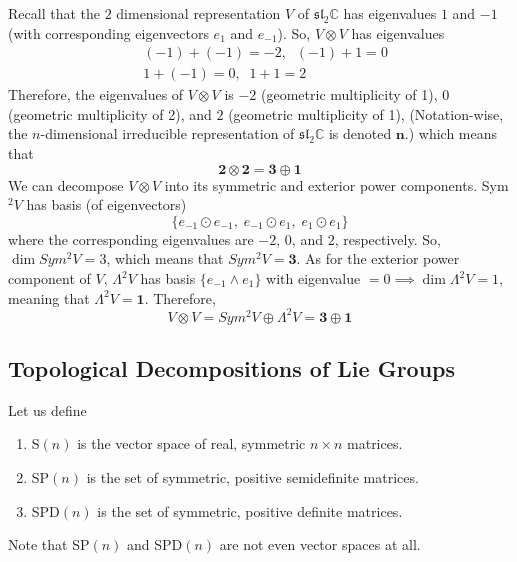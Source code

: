     \begin{example}
      Recall that the $2$ dimensional representation $V$ of $\mathfrak{sl}_2 \mathbb{C}$ has eigenvalues $1$ and $-1$ (with corresponding eigenvectors $e_1$ and $e_{-1}$). So, $V \otimes V$ has eigenvalues 
      \begin{align*}
        & (-1) + (-1) = -2, \;\; (-1) + 1 = 0 \\
        & 1 + (-1) = 0, \;\; 1 + 1 = 2
      \end{align*}
      Therefore, the eigenvalues of $V \otimes V$ is $-2$ (geometric multiplicity of 1), $0$ (geometric multiplicity of 2), and $2$ (geometric multiplicity of 1), (Notation-wise, the $n$-dimensional irreducible representation of $\mathfrak{sl}_2 \mathbb{C}$ is denoted $\mathbf{n}$.) which means that
      \begin{equation}
        \mathbf{2} \otimes \mathbf{2} = \mathbf{3} \oplus \mathbf{1}
      \end{equation}
      We can decompose $V \otimes V$ into its symmetric and exterior power components. Sym$^2 V$ has basis (of eigenvectors)
      \begin{equation}
        \{e_{-1} \odot e_{-1}, \; e_{-1} \odot e_1, \; e_1 \odot e_1\}
      \end{equation}
      where the corresponding eigenvalues are $-2$, $0$, and $2$, respectively. So, $\dim{Sym^2 V} = 3$, which means that $Sym^2 V = \mathbf{3}$. As for the exterior power component of $V$, $\Lambda^2 V$ has basis $\{e_{-1} \wedge e_1\}$ with eigenvalue $= 0 \implies \dim{\Lambda^2 V} = 1$, meaning that $\Lambda^2 V = \mathbf{1}$. Therefore, 
      \begin{equation}
        V \otimes V = Sym^2 V \oplus \Lambda^2 V = \mathbf{3} \oplus \mathbf{1}
      \end{equation}
    \end{example}

\subsection{Topological Decompositions of Lie Groups}

  \begin{definition}
    Let us define 
    \begin{enumerate}
      \item S$(n)$ is the vector space of real, symmetric $n \times n$ matrices. 
      \item SP$(n)$ is the set of symmetric, positive semidefinite matrices. 
      \item SPD$(n)$ is the set of symmetric, positive definite matrices. 
    \end{enumerate}
    Note that SP$(n)$ and SPD$(n)$ are not even vector spaces at all. 
  \end{definition}

